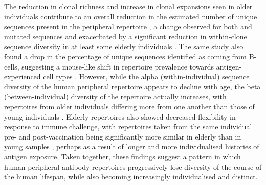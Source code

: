 The reduction in clonal richness and increase in clonal expansions seen in older individuals contribute to an overall reduction in the estimated number of unique sequences present in the peripheral repertoire \parencite{debourcy2017ageing}, a change observed for both \naive and mutated sequences and exacerbated by a significant reduction in within-clone sequence diversity in at least some elderly individuals \parencite{debourcy2017ageing}. The same study also found a drop in the percentage of unique sequences identified as coming from \naive B-cells, suggesting a mouse-like shift in repertoire prevalence towards antigen-experienced cell types \parencite{debourcy2017ageing}. However, while the alpha (within-individual) sequence diversity of the human peripheral repertoire appears to decline with age, the beta (between-individual) diversity of the repertoire actually increases, with repertoires from older individuals differing more from one another than those of young individuals \parencite{debourcy2017ageing}. Elderly repertoires also showed decreased flexibility in response to immune challenge, with repertoires taken from the same individual pre- and post-vaccination being significantly more similar in elderly than in young samples \parencite{debourcy2017ageing}, perhaps as a result of longer and more individualised histories of antigen exposure. Taken together, these findings suggest a pattern in which human peripheral antibody repertoires progressively lose diversity of the course of the human lifespan, while also becoming increasingly individualised and distinct.

